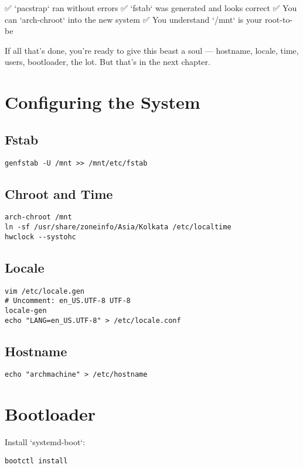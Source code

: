 \documentclass[12pt]{book}
\begin{document}
✅ `pacstrap` ran without errors  
✅ `fstab` was generated and looks correct  
✅ You can `arch-chroot` into the new system  
✅ You understand `/mnt` is your root-to-be

If all that's done, you’re ready to give this beast a soul — hostname, locale, time, users, bootloader, the lot. But that’s in the next chapter.

\clearpage


\chapter{Configuring the System}
\section{Fstab}
\begin{lstlisting}
genfstab -U /mnt >> /mnt/etc/fstab
\end{lstlisting}

\section{Chroot and Time}
\begin{lstlisting}
arch-chroot /mnt
ln -sf /usr/share/zoneinfo/Asia/Kolkata /etc/localtime
hwclock --systohc
\end{lstlisting}

\section{Locale}
\begin{lstlisting}
vim /etc/locale.gen
# Uncomment: en_US.UTF-8 UTF-8
locale-gen
echo "LANG=en_US.UTF-8" > /etc/locale.conf
\end{lstlisting}

\section{Hostname}
\begin{lstlisting}
echo "archmachine" > /etc/hostname
\end{lstlisting}

\chapter{Bootloader}
Install `systemd-boot`:
\begin{lstlisting}
bootctl install
\end{lstlisting}
\end{document}
